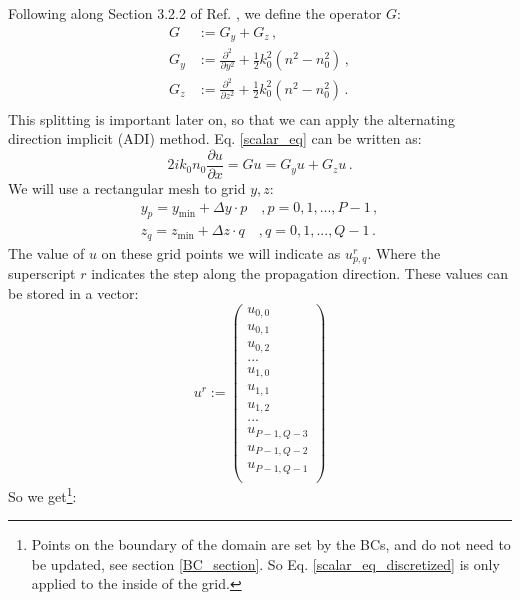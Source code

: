 \documentclass[]{article}
\begin{document}
	Following along Section 3.2.2 of Ref. \cite{Lifante_2015}, we define the operator $G$:
	\begin{subequations}
		\begin{align}
			G &:= G_y+G_z \, ,\\
			G_y &:=\frac{\partial^2}{\partial y^2}+\frac{1}{2}k_0^2(n^2-n_0^2)\, ,\\
			G_z &:=\frac{\partial^2}{\partial z^2}+\frac{1}{2}k_0^2(n^2-n_0^2)\, .\\
		\end{align}		
	\end{subequations}
	This splitting is important later on, so that we can apply the alternating direction implicit (ADI) method. Eq. \eqref{scalar_eq} can be written as:
	\begin{equation}
		2i k_0 n_0 \frac{\partial u}{\partial x} = G u = G_y u + G_z u\, .
		\label{G_operator_on_u}
	\end{equation}
	We will use a rectangular mesh to grid $y,z$:
	\begin{subequations}
		\begin{align}
			y_p = y_{\text{min}}+\Delta y\cdot p \quad, p = 0,1,...,P-1\, ,\\
			z_q = z_{\text{min}}+\Delta z\cdot q \quad, q = 0,1,...,Q-1\, .
		\end{align}
	\end{subequations}
	The value of $u$ on these grid points we will indicate as $u_{p,q}^r$. Where the superscript $r$ indicates the step along the propagation direction. These values can be stored in a vector:
	\begin{equation}
		u^r := \begin{pmatrix}
			u_{0,0}\\
			u_{0,1}\\
			u_{0,2}\\
			...\\
			u_{1,0}\\
			u_{1,1}\\
			u_{1,2}\\
			...\\
			u_{P-1,Q-3}\\
			u_{P-1,Q-2}\\
			u_{P-1,Q-1}\\
			\end{pmatrix}
			\label{uvector}
	\end{equation}
	So we get\footnote{Points on the boundary of the domain are set by the BCs, and do not need to be updated, see section \ref{BC_section}. So Eq. \eqref{scalar_eq_discretized} is only applied to the inside of the grid.}:
\end{document}
